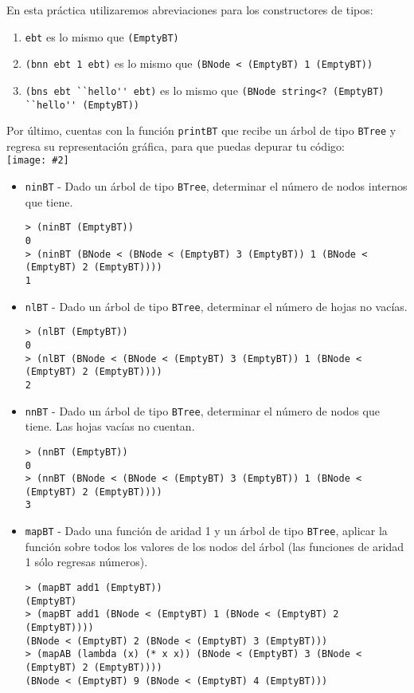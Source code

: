 \documentclass{article}
\newcommand{\jimage}[2]{\texttt{[image: \#2]}\vskip10pt}
\begin{document}
En esta práctica utilizaremos abreviaciones para los constructores de tipos:

\begin{enumerate}
\item \verb;ebt; es lo mismo que \verb;(EmptyBT);
\item \verb;(bnn ebt 1 ebt); es lo mismo que \verb;(BNode < (EmptyBT) 1 (EmptyBT));
\item \verb;(bns ebt ``hello'' ebt); es lo mismo que \verb;(BNode string<? (EmptyBT) ``hello'' (EmptyBT));
\end{enumerate}

Por último, cuentas con la función \verb;printBT; que recibe un árbol de tipo \verb;BTree; y regresa su representación gráfica, para que puedas depurar tu código: \\

\jimage{0.9}{imgs/printbt1.png}

\newpage
\begin{itemize}
\item \texttt{ninBT} - Dado un árbol de tipo \verb;BTree;, determinar el número de nodos internos que tiene.
\begin{verbatim}
> (ninBT (EmptyBT))
0
> (ninBT (BNode < (BNode < (EmptyBT) 3 (EmptyBT)) 1 (BNode < (EmptyBT) 2 (EmptyBT))))
1
\end{verbatim}

\item \texttt{nlBT} - Dado un árbol de tipo \verb;BTree;, determinar el número de hojas no vacías.
\begin{verbatim}
> (nlBT (EmptyBT))
0
> (nlBT (BNode < (BNode < (EmptyBT) 3 (EmptyBT)) 1 (BNode < (EmptyBT) 2 (EmptyBT))))
2
\end{verbatim}

\item \texttt{nnBT} - Dado un árbol de tipo \verb;BTree;, determinar el número de nodos que tiene. Las hojas vacías no cuentan.
\begin{verbatim}
> (nnBT (EmptyBT))
0
> (nnBT (BNode < (BNode < (EmptyBT) 3 (EmptyBT)) 1 (BNode < (EmptyBT) 2 (EmptyBT))))
3
\end{verbatim}

\item \texttt{mapBT} - Dado una función de aridad 1 y un árbol de tipo \verb;BTree;, aplicar la función sobre todos los valores de los nodos del árbol (las funciones de aridad 1 sólo regresas números).
\begin{verbatim}
> (mapBT add1 (EmptyBT))
(EmptyBT)
> (mapBT add1 (BNode < (EmptyBT) 1 (BNode < (EmptyBT) 2 (EmptyBT))))
(BNode < (EmptyBT) 2 (BNode < (EmptyBT) 3 (EmptyBT)))
> (mapAB (lambda (x) (* x x)) (BNode < (EmptyBT) 3 (BNode < (EmptyBT) 2 (EmptyBT))))
(BNode < (EmptyBT) 9 (BNode < (EmptyBT) 4 (EmptyBT)))
\end{verbatim}
\end{itemize}
\end{document}
